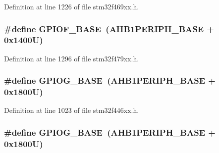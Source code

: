 Definition at line 1226 of file stm32f469xx.\+h.

\subsubsection[{\texorpdfstring{G\+P\+I\+O\+F\+\_\+\+B\+A\+SE}{GPIOF_BASE}}]{\setlength{\rightskip}{0pt plus 5cm}\#define G\+P\+I\+O\+F\+\_\+\+B\+A\+SE~({\bf A\+H\+B1\+P\+E\+R\+I\+P\+H\+\_\+\+B\+A\+SE} + 0x1400\+U)}\hypertarget{group___peripheral__memory__map_ga7f9a3f4223a1a784af464a114978d26e}{}\label{group___peripheral__memory__map_ga7f9a3f4223a1a784af464a114978d26e}


Definition at line 1296 of file stm32f479xx.\+h.

\subsubsection[{\texorpdfstring{G\+P\+I\+O\+G\+\_\+\+B\+A\+SE}{GPIOG_BASE}}]{\setlength{\rightskip}{0pt plus 5cm}\#define G\+P\+I\+O\+G\+\_\+\+B\+A\+SE~({\bf A\+H\+B1\+P\+E\+R\+I\+P\+H\+\_\+\+B\+A\+SE} + 0x1800\+U)}\hypertarget{group___peripheral__memory__map_ga5d8ca4020f2e8c00bde974e8e7c13cfe}{}\label{group___peripheral__memory__map_ga5d8ca4020f2e8c00bde974e8e7c13cfe}


Definition at line 1023 of file stm32f446xx.\+h.

\subsubsection[{\texorpdfstring{G\+P\+I\+O\+G\+\_\+\+B\+A\+SE}{GPIOG_BASE}}]{\setlength{\rightskip}{0pt plus 5cm}\#define G\+P\+I\+O\+G\+\_\+\+B\+A\+SE~({\bf A\+H\+B1\+P\+E\+R\+I\+P\+H\+\_\+\+B\+A\+SE} + 0x1800\+U)}\hypertarget{group___peripheral__memory__map_ga5d8ca4020f2e8c00bde974e8e7c13cfe}{}\label{group___peripheral__memory__map_ga5d8ca4020f2e8c00bde974e8e7c13cfe}



